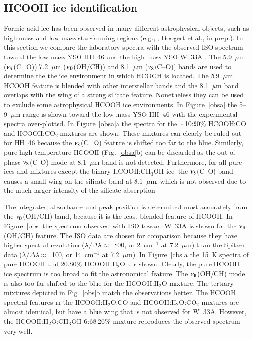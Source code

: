 \documentclass{aa}
\begin{document}
\subsection{HCOOH ice identification}
\label{id}

Formic acid ice has been observed in many different astrophysical
objects, such as high mass and low mass star-forming regions (e.g.,
\citealp{schutte1997,schutte1999}; Boogert et al., in prep.). In this
section we compare the laboratory spectra with the observed ISO
spectrum toward the low mass YSO HH~46 and the high mass YSO W~33A
\citep{boogert2004,gibb2000b}. The 5.9~$\mu$m ($\nu_{\rm S}$(C=O))
7.2~$\mu$m ($\nu_{\rm B}$(OH/CH)) and 8.1~$\mu$m ($\nu_{\rm S}$(C--O))
bands are used to determine the the ice environment in which HCOOH is
located. The 5.9~$\mu$m HCOOH feature is blended with other
interstellar bands and the 8.1~$\mu$m band overlaps with the wing of a
strong silicate feature. Nonetheless they can be used to exclude some
astrophysical HCOOH ice environments. In Figure~\ref{obsa} the
5--9~$\mu$m range is shown toward the low mass YSO HH~46 with the
experimental spectra over-plotted. In Figure~\ref{obsa}a the spectra
for the $\sim$10:90\% HCOOH:CO and HCOOH:CO$_2$ mixtures are
shown. These mixtures can clearly be ruled out for HH~46 because the
$\nu_{\rm S}$(C=O) feature is shifted too far to the blue. Similarly,
pure high temperature HCOOH (Fig.~\ref{obsa}b) can be discarded as the
out-of-phase $\nu_{\rm S}$(C--O) mode at 8.1~$\mu$m band is not
detected. Furthermore, for all pure ices and mixtures except the
binary HCOOH:CH$_3$OH ice, the $\nu_{\rm S}$(C--O) band causes a small
wing on the silicate band at 8.1~$\mu$m, which is not observed due to
the much larger intensity of the silicate absorption.

The integrated absorbance and peak position is determined most
accurately from the $\nu_{\rm B}$(OH/CH) band, because it is the least
blended feature of HCOOH. In Figure~\ref{obs} the spectrum observed
with ISO toward W~33A is shown for the $\nu_{\rm B}$(OH/CH)
feature. The ISO data are chosen for comparison because they have
higher spectral resolution ($\lambda / \Delta \lambda \approx$~800, or
2~cm$^{-1}$ at 7.2~$\mu$m) than the Spitzer data ($\lambda / \Delta
\lambda \approx$~100, or 14~cm$^{-1}$ at 7.2~$\mu$m). In
Figure~\ref{obs}a the 15~K spectra of pure HCOOH and 20:80\%
HCOOH:H$_2$O are shown. Clearly, the pure HCOOH ice spectrum is too
broad to fit the astronomical feature. The $\nu_{\rm B}$(OH/CH) mode
is also too far shifted to the blue for the HCOOH:H$_2$O mixture. The
tertiary mixtures depicted in Fig.~\ref{obs}b match the observations
better. The HCOOH spectral features in the HCOOH:H$_2$O:CO and
HCOOH:H$_2$O:CO$_2$ mixtures are almost identical, but have a blue
wing that is not observed for W~33A. However, the
HCOOH:H$_2$O:CH$_3$OH 6:68:26\% mixture reproduces the observed
spectrum very well.
\end{document}
